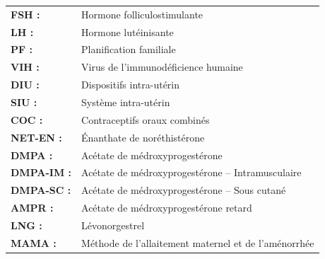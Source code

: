 \begin{table}[H]
  \begin{tabular}{l l}
  

    \textbf{FSH : } & \hspace*{8em} Hormone folliculostimulante\\ 
    \textbf{LH : } & \hspace*{8em} Hormone lutéinisante\\ 
    \textbf{PF : } & \hspace*{8em} Planification familiale\\ 
    \textbf{VIH : } & \hspace*{8em} Virus de l’immunodéficience humaine  \\ 
    \textbf{DIU : } & \hspace*{8em} Dispositifs intra-utérin\\ 
    \textbf{SIU : } & \hspace*{8em} Système intra-utérin \\ 
    \textbf{COC : } & \hspace*{8em} Contraceptifs oraux combinés \\ 
    \textbf{NET-EN : } & \hspace*{8em} Énanthate de noréthistérone \\ 
    \textbf{DMPA : } & \hspace*{8em} Acétate de médroxyprogestérone\\ 
    \textbf{DMPA-IM : } & \hspace*{8em} Acétate de médroxyprogestérone – Intramusculaire \\ 
    \textbf{DMPA-SC : } & \hspace*{8em} Acétate de médroxyprogestérone – Sous cutané \\ 
    \textbf{AMPR : } & \hspace*{8em} Acétate de médroxyprogestérone retard  \\ 
    \textbf{LNG : } & \hspace*{8em} Lévonorgestrel \\ 
    \textbf{MAMA : } & \hspace*{8em} Méthode de l’allaitement maternel et de l’aménorrhée \\  

  \end{tabular}
\end{table}



